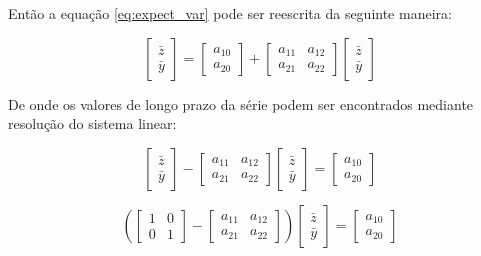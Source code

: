 Então a equação  \eqref{eq:expect_var} pode ser reescrita da seguinte maneira:

\begin{equation}
\begin{bmatrix}
\bar{z} \\\bar{y}
\end{bmatrix}=
\begin{bmatrix}a_{10} \\a_{20}\end{bmatrix}
+\begin{bmatrix}a_{11} & a_{12} \\ a_{21} & a_{22}
\end{bmatrix}\begin{bmatrix}\bar{z} \\\bar{y}
\end{bmatrix}\end{equation}

De onde os valores de longo prazo da série podem ser encontrados mediante resolução do sistema linear:

\begin{equation}\begin{bmatrix}
\bar{z} \\\bar{y}
\end{bmatrix}-\begin{bmatrix}
a_{11} & a_{12} \\a_{21} & a_{22}
\end{bmatrix}\begin{bmatrix}\bar{z} \\\bar{y}
\end{bmatrix}=\begin{bmatrix}a_{10} \\a_{20}
\end{bmatrix}\end{equation}

\begin{equation}\left(\begin{bmatrix}1 & 0 \\0 & 1
\end{bmatrix}-\begin{bmatrix}
a_{11} & a_{12} \\a_{21} & a_{22}
\end{bmatrix}\right)\begin{bmatrix}
\bar{z} \\\bar{y}\end{bmatrix}
=\begin{bmatrix}a_{10} \\a_{20}
\end{bmatrix}\end{equation}

